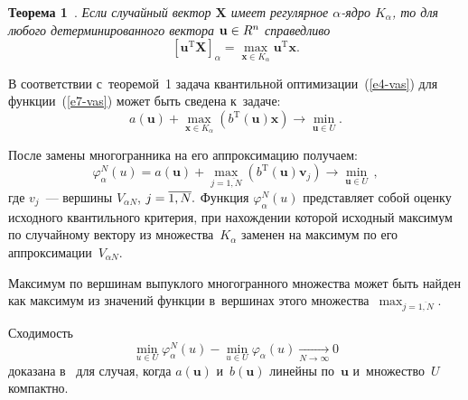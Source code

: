 \begin{multicols}{2}
\smallskip

\noindent
\textbf{Теорема 1}~\cite{kankibzun}.
 \textit{Если случайный вектор $\mathbf X$ имеет регулярное $\alpha$-ядро $K_\alpha$, 
 то для любого детерминированного вектора $\mathbf u \hm\in R^n$ справедливо}
\begin{equation*}
 \left [ \mathbf u^\mathrm{T} \mathbf X \right ]_\alpha=\max_{\mathbf x\in K_\alpha} \mathbf u^\mathrm{T} \mathbf x.
\end{equation*}


В соответствии с~теоремой~1 задача квантильной оптимизации~(\ref{e4-vas}) 
для функ\-ции~(\ref{e7-vas}) 
может быть сведена к~задаче:
\begin{equation}
a (\mathbf{u}) + \max_{\mathbf{x}\in K_\alpha}\left(b^{\mathrm{T}}(\mathbf{u}) 
\mathbf{x}\right)\to \min\limits_{\mathbf {u} \in U}.
\label{e9-vas}
\end{equation}


После замены многогранника на его аппроксимацию получаем:
 \begin{equation*}
\varphi_\alpha^N (u) = a (\mathbf {u}) + \max\limits_{j=\overline{1,N}}
\left(b^{\mathrm{T}}(\mathbf {u}) \mathbf  {v}_j\right) 
\to \min\limits_{\mathbf {u}\in U}\,,
\end{equation*}
где $v_j$~--- вершины $ V_{\alpha N}$,  $j\hm=\overline{1,N}.$ 
Функция $\varphi_\alpha^N (u)$ пред\-став\-ля\-ет собой оценку исходного 
квантильного критерия, при на\-хож\-де\-нии которой исходный максимум по 
случайному век\-то\-ру из множества~$K_\alpha$ заменен на максимум по 
его аппроксимации~$V_{\alpha N}.$ 

Максимум по вершинам выпуклого многогранного 
множества может быть найден как максимум из значений функции в~вершинах 
этого множества~$\max\nolimits_{j=\overline{1,N}}.$



Сходимость
\begin{equation*}
\min\limits_{u\in U} \varphi_\alpha^N (u)-\min\limits_{u\in U} \varphi_\alpha 
(u)\xrightarrow[{N\to \infty}]{} 0
\end{equation*}
доказана в~\cite{vaskan} для случая, когда $a (\mathbf {u})$ и~$b(\mathbf {u})$ 
линейны по~$\mathbf {u}$ и~множество~$U$ компактно.



\end{multicols}
